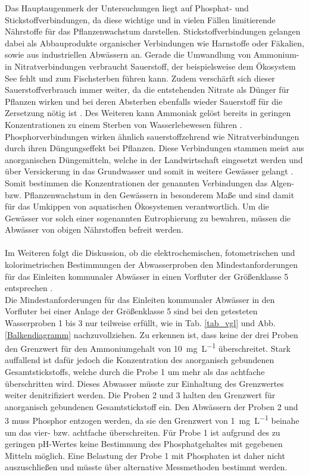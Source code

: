 \newpage
Das Hauptaugenmerk der Untersuchungen liegt auf Phosphat- und Stickstoffverbindungen, da diese wichtige und in vielen Fällen limitierende Nährstoffe für das Pflanzenwachstum darstellen.
Stickstoffverbindungen gelangen dabei als Abbauprodukte organischer Verbindungen wie Harnstoffe oder Fäkalien, sowie aus industriellen Abwässern an. Gerade die Umwandlung von Ammonium- in Nitratverbindungen verbraucht Sauerstoff, der beispielsweise dem Ökosystem See fehlt und zum Fischsterben führen kann. Zudem verschärft sich dieser Sauerstoffverbrauch immer weiter, da die entstehenden Nitrate als Dünger für Pflanzen wirken und bei deren Absterben ebenfalls wieder Sauerstoff für die Zersetzung nötig ist \cite{NundP}. Des Weiteren kann Ammoniak gelöst bereits in geringen Konzentrationen zu einem Sterben von Wasserlebewesen führen \cite{AnalyseAbwasserN}. \linebreak
Phosphorverbindungen wirken ähnlich sauerstoffzehrend wie Nitratverbindungen durch ihren Düngungseffekt bei Pflanzen. Diese Verbindungen stammen meist aus anorganischen Düngemitteln, welche in der Landwirtschaft eingesetzt werden und über Versickerung in das Grundwasser und somit in weitere Gewässer gelangt \cite{NundP,AnalyseAbwasserP}. \linebreak
Somit bestimmen die Konzentrationen der genannten Verbindungen das Algen- bzw. Pflanzenwachstum in den Gewässern in besonderem Maße und sind damit für das Umkippen von aquatischen Ökosystemen verantwortlich. Um die Gewässer vor solch einer sogenannten Eutrophierung zu bewahren, müssen die Abwässer von obigen Nährstoffen befreit werden.\\\\
Im Weiteren folgt die Diskussion, ob die elektrochemischen, fotometrischen und kolorimetrischen Bestimmungen der Abwasserproben den Mindestanforderungen für das Einleiten kommunaler Abwässer in einen Vorfluter der Größenklasse 5 entsprechen \cite[S. 29]{Skript}.\\
Die Mindestanforderungen für das Einleiten kommunaler Abwässer in den Vorfluter bei einer Anlage der Größenklasse 5 sind bei den getesteten Wasserproben 1 bis 3 nur teilweise erfüllt, wie in Tab. \ref{tab_vgl} und Abb. \ref{Balkendiagramm} nachzuvollziehen. Zu erkennen ist, dass keine der drei Proben den Grenzwert für den Ammoniumgehalt von \SI{10}{\milli \gram \per \liter} überschreitet. Stark auffallend ist dafür jedoch die Konzentration des anorganisch gebundenen Gesamtstickstoffs, welche durch die Probe 1 um mehr als das achtfache überschritten wird. Dieses Abwasser müsste zur Einhaltung des Grenzwertes weiter denitrifiziert werden. Die Proben 2 und 3 halten den Grenzwert für anorganisch gebundenen Gesamtstickstoff ein. Den Abwässern der Proben 2 und 3 muss Phosphor entzogen werden, da sie den Grenzwert von \SI{1}{\milli\gram\per\liter} beinahe um das vier- bzw. achtfache überschreiten. Für Probe 1 ist aufgrund des zu geringen pH-Wertes keine Bestimmung des Phosphatgehaltes mit gegebenen Mitteln möglich. Eine Belastung der Probe 1 mit Phosphaten ist daher nicht auszuschließen und müsste über alternative Messmethoden bestimmt werden.\\
